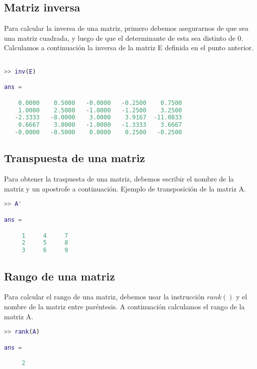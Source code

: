 \subsection{Matriz inversa}

Para calcular la inversa de una matriz, primero debemos asegurarnos de que sea una matriz cuadrada, y luego de que el determinante de esta sea distinto de 0. Calculamos a continuación la inversa de la matriz E definida en el punto anterior.
\begin{lstlisting}[language=Matlab]

>> inv(E)

ans =

    0.0000    0.5000   -0.0000   -0.2500    0.7500
    1.0000    2.5000   -1.0000   -1.2500    3.2500
   -2.3333   -8.0000    3.0000    3.9167  -11.0833
    0.6667    3.0000   -1.0000   -1.3333    3.6667
   -0.0000   -0.5000    0.0000    0.2500   -0.2500

\end{lstlisting}



\subsection{Transpuesta de una matriz}

Para obtener la traspuesta de una matriz, debemos escribir el nombre de la matriz y un apostrofe a continuación. Ejemplo de transposición de la matriz A.
\begin{lstlisting}[language=Matlab]
>> A'

ans =

     1     4     7
     2     5     8
     3     6     9

\end{lstlisting}



\subsection{Rango de una matriz}

Para calcular el rango de una matriz, debemos usar la instrucción $rank()$ y el nombre de la matriz entre paréntesis. A continuación calculamos el rango de la matriz A.
\begin{lstlisting}[language=Matlab]
>> rank(A)

ans =

     2

\end{lstlisting}


